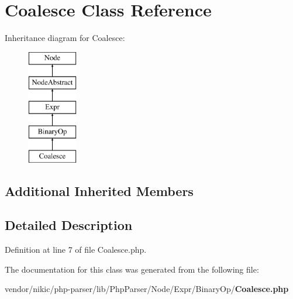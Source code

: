 \section{Coalesce Class Reference}
\label{class_php_parser_1_1_node_1_1_expr_1_1_binary_op_1_1_coalesce}
Inheritance diagram for Coalesce\+:\begin{figure}[H]
\begin{center}
\leavevmode
\includegraphics[height=5.000000cm]{class_php_parser_1_1_node_1_1_expr_1_1_binary_op_1_1_coalesce}
\end{center}
\end{figure}
\subsection*{Additional Inherited Members}


\subsection{Detailed Description}


Definition at line 7 of file Coalesce.\+php.



The documentation for this class was generated from the following file\+:\begin{DoxyCompactItemize}
\item 
vendor/nikic/php-\/parser/lib/\+Php\+Parser/\+Node/\+Expr/\+Binary\+Op/{\bf Coalesce.\+php}\end{DoxyCompactItemize}
